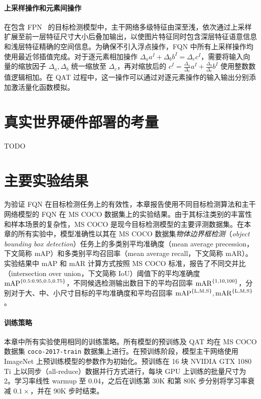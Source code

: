 \paragraph{上采样操作和元素间操作}
在包含 FPN~\citep{lin2017feature} 的目标检测模型中，主干网络多级特征由深至浅，依次通过上采样扩展至前一层特征尺寸大小后叠加输出，以使图片特征同时包含深层特征语意信息和浅层特征精确的空间信息。为确保不引入浮点操作，FQN 中所有上采样操作均使用最近邻插值完成。对于逐元素相加操作 $\Delta_a a^I + \Delta_b b^I = \Delta_c c^I$，需要将输入向量的缩放因子 $\Delta_a, \Delta_b$ 统一缩放至 $\Delta_c$，再对缩放后的 $c^I = \frac{\Delta_a}{\Delta_c}a^{I} + \frac{\Delta_b}{\Delta_c}b^{I}$ 使用整数数值逻辑相加。在 QAT 过程中，这一操作可以通过对逐元素操作的输入输出分别添加激活量化函数模拟。
\section{真实世界硬件部署的考量} \label{sec::fqn::deployment}
TODO
\section{主要实验结果} \label{sec::fqn::experiments}
为验证 FQN 在目标检测任务上的有效性，本章报告使用不同目标检测算法和主干网络模型的 FQN 在 MS COCO 数据集上的实验结果。由于其标注类别的丰富性和样本场景的复杂性，MS COCO 是现今目标检测模型的主要评测数据集。在本章的所有实验中，模型准确性以其在 MS COCO 数据集\emph{物体边界框检测}（\emph{object bounding box detection}）任务上的多类别平均准确度（mean average precession，下文简称 mAP）和多类别平均召回率（mean average recall，下文简称 mAR）。实验结果中 mAP 和 mAR 计算方式按照 MS COCO 标准，报告了不同交并比（intersection over union，下文简称 IoU）阈值下的平均准确度 $\mathrm{mAP}^{\mathrm{ \{0.5:0.95, 0.5, 0.75\} }}$，不同候选检测输出数目下的平均召回率 $\mathrm{mAR}^{\mathrm{ \{1, 10, 100\} }}$，分别对于大、中、小尺寸目标的平均准确度和平均召回率 $\mathrm{mAP}^{\mathrm{ \{L, M, S\} }}, \mathrm{mAR}^{\mathrm{ \{L, M, S\} }}$。

\paragraph{训练策略}
本章中所有实验使用相同的训练策略。所有模型的预训练及 QAT 均在 MS COCO 数据集 \verb|coco-2017-train| 数据集上进行。在预训练阶段，模型主干网络使用 ImageNet 上预训练模型的参数作为初始化。预训练在 16 块 NVIDIA GTX 1080 Ti 上以同步（all-reduce）数据并行方式进行，每块 GPU 上训练的批量尺寸为 2。学习率线性 warmup 至 0.04，之后在训练第 30K 和第 80K 步分别将学习率衰减 $0.1\times$，并在 90K 步时结束。

